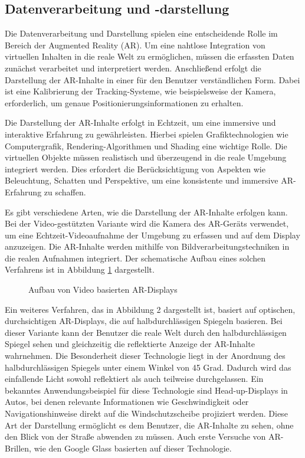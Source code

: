 \subsection{Datenverarbeitung und -darstellung}
Die Datenverarbeitung und Darstellung spielen eine entscheidende Rolle im
Bereich der Augmented Reality (AR). Um eine nahtlose Integration von virtuellen
Inhalten in die reale Welt zu ermöglichen, müssen die erfassten Daten zunächst
verarbeitet und interpretiert werden. Anschließend erfolgt die Darstellung der
AR-Inhalte in einer für den Benutzer verständlichen Form. Dabei ist eine
Kalibrierung der Tracking-Systeme, wie beispielsweise der Kamera, erforderlich,
um genaue Positionierungsinformationen zu erhalten.

Die Darstellung der AR-Inhalte erfolgt in Echtzeit, um eine immersive und
interaktive Erfahrung zu gewährleisten. Hierbei spielen Grafiktechnologien wie
Computergrafik, Rendering-Algorithmen und Shading eine wichtige Rolle. Die
virtuellen Objekte müssen realistisch und überzeugend in die reale Umgebung
integriert werden. Dies erfordert die Berücksichtigung von Aspekten wie
Beleuchtung, Schatten und Perspektive, um eine konsistente und immersive
AR-Erfahrung zu schaffen.

Es gibt verschiedene Arten, wie die Darstellung der AR-Inhalte erfolgen kann.
Bei der Video-gestützten Variante wird die Kamera des AR-Geräts verwendet, um
eine Echtzeit-Videoaufnahme der Umgebung zu erfassen und auf dem Display
anzuzeigen. Die AR-Inhalte werden mithilfe von Bildverarbeitungstechniken in
die realen Aufnahmen integriert. Der schematische Aufbau eines solchen
Verfahrens ist in Abbildung \ref{fig:VBAR} dargestellt.

\begin{figure}[h]
      \centering
      
      \caption[width=0.7\columnwidth]{Aufbau von Video basierten AR-Displays \cite{billinghurst2015survey}}
      \label{fig:VBAR}
\end{figure}

Ein weiteres Verfahren, das in Abbildung 2 dargestellt ist, basiert auf
optischen, durchsichtigen AR-Displays, die auf halbdurchlässigen Spiegeln
basieren. Bei dieser Variante kann der Benutzer die reale Welt durch den
halbdurchlässigen Spiegel sehen und gleichzeitig die reflektierte Anzeige der
AR-Inhalte wahrnehmen. Die Besonderheit dieser Technologie liegt in der
Anordnung des halbdurchlässigen Spiegels unter einem Winkel von 45 Grad.
Dadurch wird das einfallende Licht sowohl reflektiert als auch teilweise
durchgelassen. Ein bekanntes Anwendungsbeispiel für diese Technologie sind
Head-up-Displays in Autos, bei denen relevante Informationen wie
Geschwindigkeit oder Navigationshinweise direkt auf die Windschutzscheibe
projiziert werden. Diese Art der Darstellung ermöglicht es dem Benutzer, die
AR-Inhalte zu sehen, ohne den Blick von der Straße abwenden zu müssen. Auch
erste Versuche von AR-Brillen, wie den Google Glass basierten auf dieser
Technologie.

